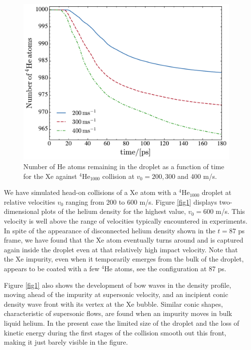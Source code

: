 %
\begin{figure}[!]
\centerline{\includegraphics[width=0.9\linewidth,clip]{nparticles}}
\caption{\label{fig4} 
Number of He atoms remaining in the droplet as a function of time for the
Xe against $^4$He$_{1000}$ collision at $v_0 = 200, 300$ and 400 m/s.
}
\end{figure}

We have simulated head-on collisions of a Xe atom with a
$^4$He$_{1000}$ droplet at relative velocities $v_0$ 
ranging from 200 to 600 m/s.  Figure \ref{fig1} 
displays two-dimensional plots of the helium density 
for the highest value, $v_0= 600$ m/s. This velocity is 
well above the range of velocities typically encountered
in experiments.\cite{Gom11,Gom14,Jon16}  
In spite of the appearance of disconnected helium density shown in the 
$t= 87$ ps frame, we have found that the Xe atom eventually 
turns around and is 
captured again inside the droplet even at that relatively high impact velocity. 
Note that the Xe impurity, even when it temporarily emerges from the bulk of the 
droplet, appears to be coated with a few
$^4$He atoms, see the configuration at 87 ps.

Figure \ref{fig1}  also shows the development of bow waves in the density profile, moving 
ahead of the impurity at 
supersonic velocity, and
an incipient  conic  density wave front  with its vertex at the Xe bubble.
Similar conic shapes, characteristic of supersonic flows, 
are found when an impurity moves in bulk liquid helium. 
In the present case the limited size of the droplet and 
the loss of kinetic energy
during the first stages of the collision
smooth out this front, making it just barely visible in the figure.

